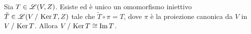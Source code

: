 \begin{teorema} \label{t:primo-isomorfismo}
	Sia $T\in\mathscr L(V,Z)$.
	Esiste ed è unico un omomorfismo iniettivo $\tilde{T}\in\mathscr L(V\,/\,\operatorname{Ker} T,Z)$ tale che $\tilde{T}\circ\pi=T$, dove $\pi$ è la proiezione canonica da $V$ in $V\,/\,\operatorname{Ker} T$.
	Allora $V\,/\,\operatorname{Ker} T\cong\operatorname{Im} T$.
	\begin{figure}[h!]
		\centering
	\end{figure}
\end{teorema}
